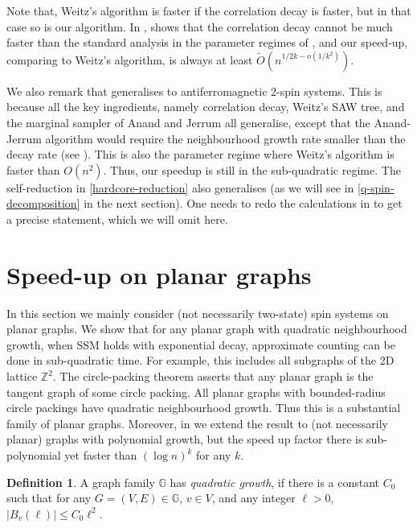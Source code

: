 \documentclass[11pt]{amsart}
\def\=#1{\mathbb{#1}}
\newcommand{\abs}[1]{\ensuremath{\left\vert#1\right\vert}}
\theoremstyle{definition}
\newtheorem{definition}[theorem]{Definition}
\theoremstyle{remark}
\begin{document}
Note that, Weitz's algorithm is faster if the correlation decay is faster,
but in that case so is our algorithm.
In ,
 shows that the correlation decay cannot be much faster than the standard analysis in the parameter regimes of ,
and our speed-up, comparing to Weitz's algorithm, is always at least $\widetilde{O}(n^{1/2k-o(1/k^2)})$.

We also remark that  generalises to antiferromagnetic 2-spin systems.
This is because all the key ingredients, namely correlation decay, Weitz's SAW tree, and the marginal sampler of Anand and Jerrum all generalise,
except that the Anand-Jerrum algorithm would require the neighbourhood growth rate smaller than the decay rate (see ).
This is also the parameter regime where Weitz's algorithm is faster than $O(n^2)$.
Thus, our speedup is still in the sub-quadratic regime.
The self-reduction in \eqref{hardcore-reduction} also generalises (as we will see in \eqref{q-spin-decomposition} in the next section).
One needs to redo the calculations in  to get a precise statement, which we will omit here.

\section{Speed-up on planar graphs}
In this section we mainly consider (not necessarily two-state) spin systems on planar graphs.
We show that for any planar graph with quadratic neighbourhood growth,
when SSM holds with exponential decay,
approximate counting can be done in sub-quadratic time.
For example, this includes all subgraphs of the 2D lattice $\=Z^2$.
The circle-packing theorem asserts that any planar graph is the tangent graph of some circle packing.
All planar graphs with bounded-radius circle packings have quadratic neighbourhood growth.
Thus this is a substantial family of planar graphs.
Moreover, in  we extend the result to (not necessarily planar) graphs with polynomial growth,
but the speed up factor there is sub-polynomial yet faster than $(\log n)^k$ for any $k$.

\begin{definition}  \label{def:quadratic-growth}
  A graph family $\=G$ has \emph{quadratic growth},
  if there is a constant $C_0$ such that for any $G=(V,E)\in\=G$, $v\in V$, and any integer $\ell>0$,
  $\abs{B_v(\ell)}\le C_0\ell^2$.
\end{definition}
\end{document}
